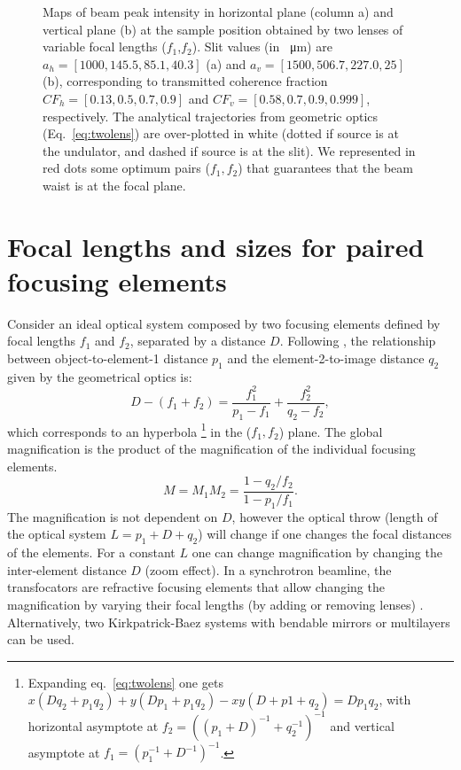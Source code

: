 \documentclass{osa-article}
\begin{document}
\begin{figure}[htbp]
\caption{
        \label{fig:f1f2map}
    Maps of beam peak intensity in horizontal plane (column a) and vertical plane (b) at the sample position obtained by two lenses of variable focal lengths ($f_1$,$f_2$).
    Slit values (in \SI{}{\micro\meter}) are $a_h=[1000, 145.5, 85.1, 40.3]$ (a) and $a_v=[1500, 506.7, 227.0, 25]$ (b), corresponding to transmitted coherence fraction
    $CF_h=[0.13, 0.5, 0.7, 0.9]$ and
    $CF_v=[0.58, 0.7, 0.9, 0.999]$, respectively.
    The analytical trajectories from geometric optics (Eq.~\ref{eq:twolens}) are over-plotted in white (dotted if source is at the undulator, and dashed if source is at the slit). We represented in red dots some optimum pairs ($f_1,f_2$) that guarantees that the beam waist is at the focal plane.
    }
\end{figure}




\section{Focal lengths and sizes for paired focusing elements}

Consider an ideal optical system composed by two focusing elements defined by focal lengths $f_1$ and $f_2$, separated by a distance $D$. Following \cite{Goodman85}, the relationship between object-to-element-1 distance $p_1$ and the element-2-to-image distance $q_2$ given by the geometrical optics is:
\begin{equation}
\label{eq:twolens}
    D-(f_1+f_2)=\frac{f_1^2}{p_1-f_1} + \frac{f_2^2}{q_2-f_2},
\end{equation}
which corresponds to an hyperbola
\footnote{Expanding eq.~\ref{eq:twolens} one gets $x(D q_2 + p_1 q_2) + y (D p_1 + p_1 q_2) - x y (D + p1 + q_2) = D p_1 q_2$,  with horizontal asymptote at $f_{2}=((p_1+D)^{-1}+q_2^{-1})^{-1}$ and vertical asymptote at $f_{1}=(p_1^{-1}+D^{-1})^{-1}$.} in the ($f_1,f_2$) plane.
The global magnification is the product of the magnification of the individual focusing elements.
\begin{equation}
\label{eq:magnification}
    M=M_1 M_2=\frac{1-q_2/f_2}{1-p_1/f_1}.
\end{equation}
The magnification is not dependent on $D$, however the optical throw (length of the optical system $L=p_1+D+q_2$) will change if one changes the focal distances of the elements. For a constant $L$ one can change magnification by changing the inter-element distance $D$ (zoom effect). In a synchrotron beamline, the transfocators are refractive focusing elements that allow changing the magnification by varying their focal lengths (by adding or removing lenses) \cite{Vaughan:kv5084}. Alternatively, two Kirkpatrick-Baez systems with bendable mirrors or multilayers can be used. 
\end{document}
